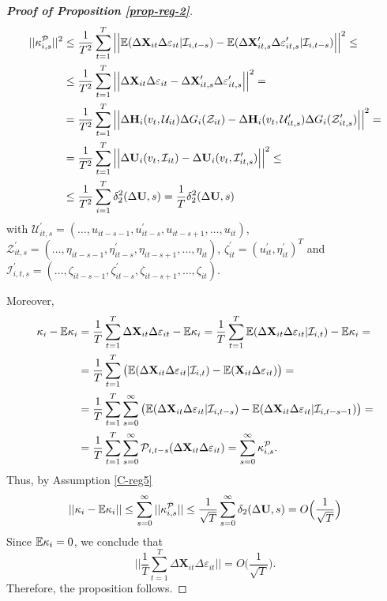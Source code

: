 \documentclass[a4paper,12pt]{article}
\begin{document}
\begin{proof}[\textnormal{\textbf{Proof of Proposition \ref{prop-reg-2}}}]
\begin{align*}
||\kappa_{i, s}^{\mathcal{P}}||^2 &\leq \frac{1}{T^2} \sum_{t=1}^T \Big|\Big| \mathbb{E} (\Delta \mathbf{X}_{it}\Delta \varepsilon_{it}|\mathcal{I}_{i, t-s}) -\mathbb{E} (\Delta \mathbf{X}_{it, s}^\prime\Delta \varepsilon_{it, s}^\prime|\mathcal{I}_{i, t-s}) \Big|\Big|^2 \leq \\
&\leq \frac{1}{T^2} \sum_{t=1}^T \Big|\Big| \Delta \mathbf{X}_{it}\Delta \varepsilon_{it} -\Delta \mathbf{X}_{it, s}^\prime\Delta \varepsilon_{it, s}^\prime\Big|\Big|^2 =\\
& = \frac{1}{T^2} \sum_{t=1}^T \Big|\Big| \Delta \mathbf{H}_i(v_t, \mathcal{U}_{it})  \Delta G_i(\mathcal{Z}_{it}) - \Delta \mathbf{H}_i(v_t, \mathcal{U}_{it, s}^\prime)  \Delta G_i(\mathcal{Z}_{it, s}^\prime)\Big|\Big|^2 =\\
& = \frac{1}{T^2} \sum_{t=1}^T \Big|\Big| \Delta \mathbf{U}_i(v_t, \mathcal{I}_{it})  - \Delta \mathbf{U}_i(v_t, \mathcal{I}_{it, s}^\prime) \Big|\Big|^2 \leq \\
&\leq \frac{1}{T^2} \sum_{i=1}^T \delta_2^2(\Delta \mathbf{U}, s) = \frac{1}{T}\delta_2^2(\Delta \mathbf{U}, s)
\end{align*}
with $\mathcal{U}_{it, s}^\prime = (\ldots, u_{it-s-1}, u^\prime_{it-s}, u_{it-s+1}, \ldots, u_{it})$, $\mathcal{Z}_{it, s}^\prime = (\ldots, \eta_{it-s-1}, \eta^\prime_{it-s}, \eta_{it-s+1}, \ldots, \eta_{it})$, $\zeta^\prime_{it} = (u_{it}^\prime, \eta_{it}^\prime)^T$ and $\mathcal{I}_{i,t,s}^\prime =(\ldots, \zeta_{it-s-1}, \zeta^\prime_{it-s}, \zeta_{it-s+1}, \ldots, \zeta_{it})$.

Moreover,
\begin{align*}
\kappa_i - \mathbb{E} \kappa_i &= \frac{1}{T}\sum_{t=1}^T \Delta \mathbf{X}_{it}\Delta \varepsilon_{it} - \mathbb{E} \kappa_i = \frac{1}{T}\sum_{t=1}^T \mathbb{E} ( \Delta \mathbf{X}_{it}\Delta \varepsilon_{it}|\mathcal{I}_{i,t}) - \mathbb{E} \kappa_i =\\
&= \frac{1}{T}\sum_{t=1}^T \big( \mathbb{E} ( \Delta \mathbf{X}_{it}\Delta \varepsilon_{it}|\mathcal{I}_{i,t} ) - \mathbb{E} ( \mathbf{X}_{it}\Delta \varepsilon_{it}) \big) = \\
&= \frac{1}{T}\sum_{t=1}^T \sum_{s=0}^\infty \big( \mathbb{E} ( \Delta \mathbf{X}_{it}\Delta \varepsilon_{it}|\mathcal{I}_{i,t-s} ) - \mathbb{E} ( \Delta \mathbf{X}_{it}\Delta \varepsilon_{it}|\mathcal{I}_{i,t-s-1} )  \big) =\\
&= \frac{1}{T}\sum_{t=1}^T \sum_{s=0}^\infty \mathcal{P}_{i, t-s} (\Delta \mathbf{X}_{it}\Delta \varepsilon_{it}) = \sum_{s=0}^\infty \kappa_{i, s}^{\mathcal{P}}.
\end{align*}
Thus, by Assumption \eqref{C-reg5}
\[ || \kappa_i - \mathbb{E} \kappa_i || \leq \sum_{s=0}^\infty ||\kappa_{i, s}^{\mathcal{P}} || \leq \frac{1}{\sqrt{T}}\sum_{s=0}^\infty \delta_2(\Delta \mathbf{U}, s) = O\Big(\frac{1}{\sqrt{T}}\Big)
\]
Since $\mathbb{E} \kappa_i = 0$, we conclude that
\[  \Big|\Big| \frac{1}{T}\sum_{t=1}^T  \Delta \mathbf{X}_{it}\Delta \varepsilon_{it} \Big|\Big| = O\Big(\frac{1}{\sqrt{T}}\Big).
\]
Therefore, the proposition follows.
\end{proof}
\end{document}
